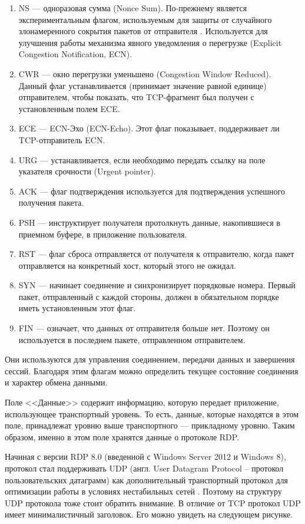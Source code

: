\documentclass[bachelor, och, coursework]{SCWorks}
\begin{document}
\begin{enumerate}
  \item NS --- одноразовая сумма (Nonce Sum). По-прежнему является экспериментальным флагом, используемым для защиты от случайного
  злонамеренного сокрытия пакетов от отправителя \cite{tcpflags}. Используется для улучшения работы механизма явного уведомления 
  о перегрузке (Explicit Congestion Notification, ECN).
  \item CWR --- окно перегрузки уменьшено (Congestion Window Reduced). 
  Данный флаг устанавливается (принимает значение равной единице) отправителем, чтобы показать, что TCP-фрагмент был
  получен с установленным полем ECE.
  \item ECE --- ECN-Эхо (ECN-Echo). Этот флаг показывает, поддерживает ли TCP-отправитель ECN.
  \item URG --- устанавливается, если необходимо передать ссылку на поле указателя срочности (Urgent pointer).
  \item ACK --- флаг подтверждения используется для подтверждения успешного получения пакета.
  \item PSH --- инструктирует получателя протолкнуть данные, накопившиеся в приемном буфере, в приложение пользователя.
  \item RST --- флаг сброса отправляется от получателя к отправителю, когда пакет отправляется на конкретный хост, который этого не ожидал.
  \item SYN --- начинает соединение и синхронизирует порядковые номера. Первый пакет, отправленный с каждой стороны, должен в обязательном порядке иметь установленным этот флаг.
  \item FIN --- означает, что данных от отправителя больше нет. Поэтому он используется в последнем пакете, отправленном отправителем.
\end{enumerate}

Они используются для управления соединением, передачи данных и завершения сессий.
Благодаря этим флагам можно определить текущее состояние соединения и характер обмена данными.

Поле <<Данные>> содержит информацию, которую передает приложение, использующее транспортный уровень. То есть, данные, которые 
находятся в этом поле, принадлежат уровню выше транспортного --- прикладному уровню. Таким образом, именно в этом поле хранятся данные о протоколе RDP.

Начиная с версии RDP 8.0 (введенной с Windows Server 2012 и Windows 8), протокол стал поддерживать UDP (англ. User Datagram Protocol -- протокол пользовательских датаграмм)
как дополнительный транспортный протокол для оптимизации работы в условиях нестабильных сетей \cite{udpseg}. Поэтому на структуру UDP протокола тоже стоит обратить внимание.
В отличие от TCP протокол UDP имеет минималистичный заголовок. Его можно увидеть на следующем рисунке.
\end{document}
